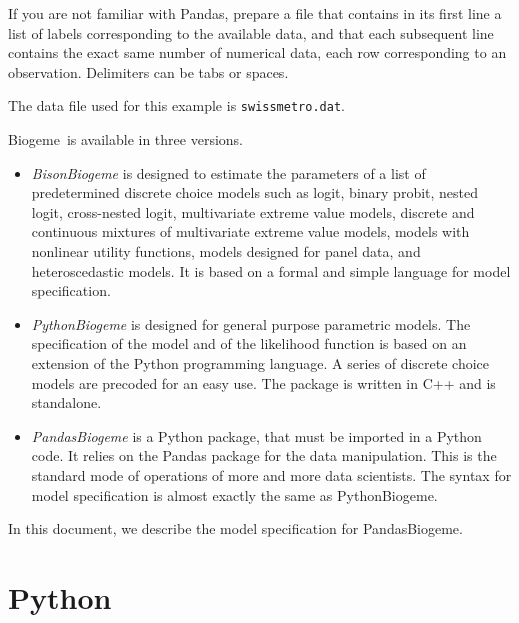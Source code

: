 \documentclass[12pt,a4paper]{article}
\newcommand{\PBIOGEME}{PythonBiogeme}
\newcommand{\PDBIOGEME}{PandasBiogeme}
\newcommand{\BIOGEME}{Biogeme}
\begin{document}
If you are not familiar with Pandas, prepare a file that contains in its first line a list
of labels corresponding to the available data, and that each
subsequent line contains the exact same number of numerical data, each
row corresponding to an observation. Delimiters can be tabs or
spaces. 


The data file used for this example is \texttt{swissmetro.dat}.

\BIOGEME\ is available in three versions.
\begin{itemize}
  \item \emph{BisonBiogeme} is designed to
estimate the parameters of a list of predetermined discrete choice
models such as logit, binary probit, nested logit, cross-nested logit,
multivariate extreme value models, discrete and continuous mixtures of
multivariate extreme value models, models with nonlinear utility
functions, models designed for panel data, and heteroscedastic
models. It is based on a formal and simple language for model
specification.
\item \emph{PythonBiogeme} is designed for general purpose parametric models. The
specification of the model and of the likelihood function is based on
an extension of the Python programming language. A series of discrete
choice models are precoded for an easy use. The package is written in
C++ and is standalone.
\item \emph{PandasBiogeme} is a Python package, that must be imported in a
Python code. It relies on the Pandas package for the data
manipulation. This is the standard mode of operations of more and more
data scientists. The syntax for model specification is almost exactly
the same as \PBIOGEME. 
\end{itemize}
In this document, we describe the model
specification for \PDBIOGEME.

\section{Python}
\end{document}
